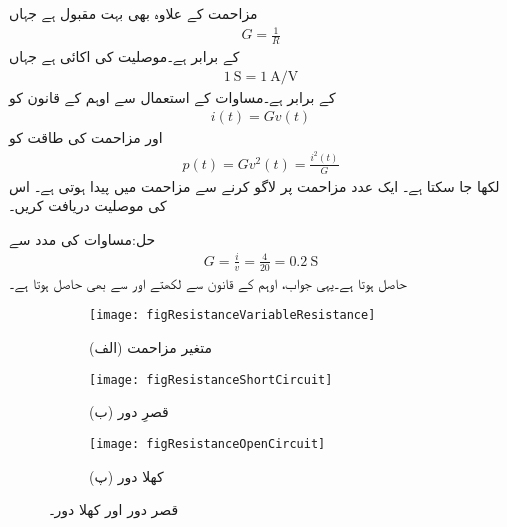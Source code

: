 مزاحمت کے علاوہ   بھی بہت مقبول ہے جہاں
\begin{align}\label{مساوات_مزاحمتی_موصلیت_اور_مزاحمت}
G=\frac{1}{R}
\end{align}
کے برابر ہے۔موصلیت کی اکائی   ہے جہاں
\begin{align}
\SI{1}{\siemens}=\SI{1}{\ampere\per\volt}
\end{align}
کے برابر ہے۔مساوات  کے استعمال سے  اوہم کے قانون کو
\begin{align}\label{مساوات_مزاحمتی_موصلیت_تعریف}
i(t)=G v(t)
\end{align}
اور مزاحمت کی طاقت کو
\begin{align}
p(t)=G v^2(t)=\frac{i^2(t)}{G}
\end{align}
لکھا جا سکتا ہے۔
ایک عدد مزاحمت پر  لاگو کرنے سے  مزاحمت میں  پیدا ہوتی ہے۔ اس کی موصلیت دریافت کریں۔

حل:مساوات  کی مدد سے
\begin{align*}
G=\frac{i}{v}=\frac{4}{20}=\SI{0.2}{\siemens}
\end{align*}
حاصل ہوتا ہے۔یہی جواب، اوہم کے قانون سے   لکھتے اور  سے بھی حاصل ہوتا ہے۔

\begin{figure}
\centering
\begin{subfigure}{0.3\textwidth}
\centering
\texttt{[image: figResistanceVariableResistance]}
\caption*{(الف) متغیر مزاحمت}
\end{subfigure}%
%
\begin{subfigure}{0.3\textwidth}
\centering
\texttt{[image: figResistanceShortCircuit]}
\caption*{(ب) قصرِ دور}
\end{subfigure}%
%
\begin{subfigure}{0.3\textwidth}
\centering
\texttt{[image: figResistanceOpenCircuit]}
\caption*{(پ) کھلا دور }
\end{subfigure}%
\caption{قصر دور اور کھلا دور۔}
\label{شکل_مزاحمت_قصر_اور_کھلا_دور}
\end{figure}

